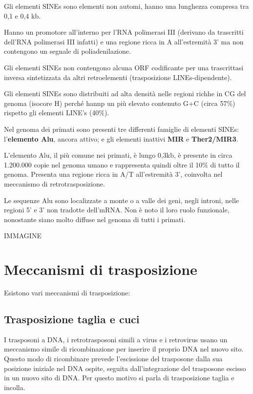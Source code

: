 \documentclass[11pt]{book}
\begin{document}
Gli elementi SINEs sono elementi non automi, hanno una lunghezza
compresa tra 0,1 e 0,4 kb.

Hanno un promotore all'interno per l'RNA polimerasi III (derivano da
trascritti dell'RNA polimerasi III infatti) e una regione ricca in A
all'estremità 3' ma non contengono un segnale di poliadenilazione.

Gli elementi SINEs non contengono alcuna ORF codificante per una
trascrittasi inversa sintetizzata da altri retroelementi (trasposizione
LINEs-dipendente).

Gli elementi SINEs sono distribuiti ad alta densità nelle regioni richhe
in CG del genoma (isocore H) perché hannp un più elevato contenuto G+C
(circa 57\%) rispetto gli elementi LINE's (40\%).

Nel genoma dei primati sono presenti tre differenti famiglie di elementi
SINEs: l'\textbf{elemento Alu}, ancora attivo; e gli elementi inattivi
\textbf{MIR} e \textbf{Ther2/MIR3}.

L'elemento Alu, il più comune nei primati, è lungo 0,3kb, è presente in
circa 1.200.000 copie nel genoma umano e rappresenta quindi oltre il
10\% di tutto il genoma. Presenta una regione ricca in A/T all'estremità
3', coinvolta nel meccanismo di retrotrasposizione.

Le sequenze Alu sono localizzate a monte o a valle dei geni, negli
introni, nelle regioni 5' e 3' non tradotte dell'mRNA. Non è noto il
loro ruolo funzionale, nonostante siano molto diffuse nel genoma di
tutti i primati.

IMMAGINE

\section{Meccanismi di
trasposizione}\label{meccanismi-di-trasposizione}

Esistono vari meccanismi di trasposizione:

\subsection{Trasposizione taglia e cuci}

I trasposoni a DNA, i retrotrasposoni simili a
virus e i retrovirus usano un meccanismo simile di ricombinazione per
inserire il proprio DNA nel nuovo sito. Questo modo di ricombinare
prevede l'escissione del trasposone dalla sua posizione iniziale nel
DNA ospite, seguita dall'integrazione del trasposone escisso in un
nuovo sito di DNA. Per questo motivo si parla di trasposizione taglia
e incolla.
\end{document}

